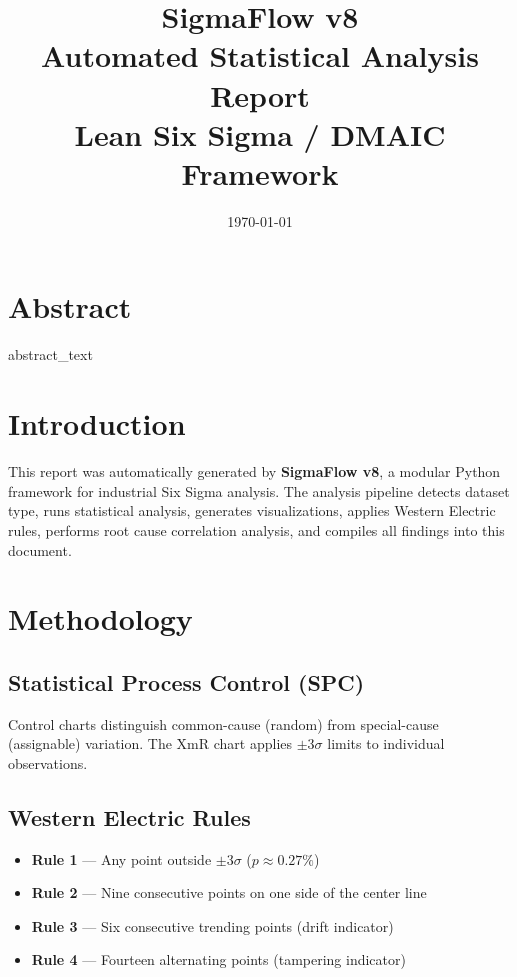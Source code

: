 \documentclass[12pt, a4paper]{article}
\title{
  \vspace{1.5cm}
  {\color{sigmaBlue}\Huge\bfseries SigmaFlow v8\\[0.3em]
  Automated Statistical Analysis Report}\\[0.7em]
  {\large\color{sigmaGray} Lean Six Sigma / DMAIC Framework}
}
\author{}
\date{\today}
\begin{document}
\maketitle
\thispagestyle{empty}
\newpage

\section*{Abstract}

\begin{flushleft}
\colorbox{abstractBg}{\parbox{0.96\textwidth}{
\smallskip
{{abstract_text}}
\smallskip
}}
\end{flushleft}

\newpage
\tableofcontents
\newpage

\section{Introduction}

This report was automatically generated by \textbf{SigmaFlow v8}, a modular
Python framework for industrial Six Sigma analysis. The analysis pipeline
detects dataset type, runs statistical analysis, generates visualizations,
applies Western Electric rules, performs root cause correlation analysis,
and compiles all findings into this document.

\section{Methodology}

\subsection{Statistical Process Control (SPC)}
Control charts distinguish common-cause (random) from special-cause
(assignable) variation. The XmR chart applies $\pm 3\sigma$ limits to
individual observations.

\subsection{Western Electric Rules}
\begin{itemize}
  \item \textbf{Rule 1} — Any point outside $\pm 3\sigma$ ($p \approx 0.27\%$)
  \item \textbf{Rule 2} — Nine consecutive points on one side of the center line
  \item \textbf{Rule 3} — Six consecutive trending points (drift indicator)
  \item \textbf{Rule 4} — Fourteen alternating points (tampering indicator)
\end{itemize}
\end{document}
